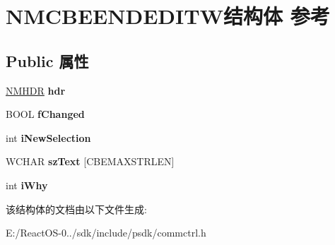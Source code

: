 \hypertarget{struct_n_m_c_b_e_e_n_d_e_d_i_t_w}{}\section{N\+M\+C\+B\+E\+E\+N\+D\+E\+D\+I\+T\+W结构体 参考}
\label{struct_n_m_c_b_e_e_n_d_e_d_i_t_w}
\subsection*{Public 属性}
\begin{DoxyCompactItemize}
\item 
\mbox{\label{struct_n_m_c_b_e_e_n_d_e_d_i_t_w_a62804ee74533d02f985ccd979e7fa022}} 
\hyperlink{structtag_n_m_h_d_r}{N\+M\+H\+DR} {\bfseries hdr}
\item 
\mbox{\label{struct_n_m_c_b_e_e_n_d_e_d_i_t_w_af1e7b6fc476e5770174967b376366a28}} 
B\+O\+OL {\bfseries f\+Changed}
\item 
\mbox{\label{struct_n_m_c_b_e_e_n_d_e_d_i_t_w_a314f6a8c2266a6e58d2d9ee1bdc313a7}} 
int {\bfseries i\+New\+Selection}
\item 
\mbox{\label{struct_n_m_c_b_e_e_n_d_e_d_i_t_w_aef03f94627e383fe20c7d9f93ed84ed6}} 
W\+C\+H\+AR {\bfseries sz\+Text} \mbox{[}C\+B\+E\+M\+A\+X\+S\+T\+R\+L\+EN\mbox{]}
\item 
\mbox{\label{struct_n_m_c_b_e_e_n_d_e_d_i_t_w_a9fddf4b9a6790db189e4464c2aeb7aef}} 
int {\bfseries i\+Why}
\end{DoxyCompactItemize}


该结构体的文档由以下文件生成\+:\begin{DoxyCompactItemize}
\item 
E\+:/\+React\+O\+S-\/0../sdk/include/psdk/commctrl.\+h\end{DoxyCompactItemize}
